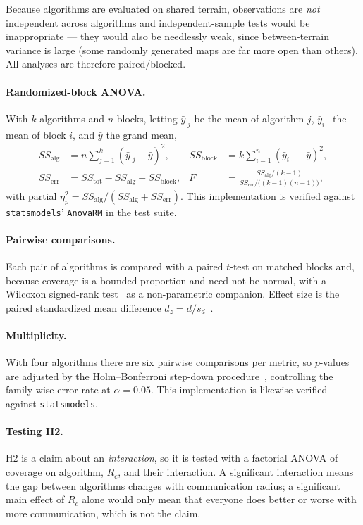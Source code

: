 \documentclass[11pt]{article}
\begin{document}
Because algorithms are evaluated on shared terrain, observations are
\emph{not} independent across algorithms and independent-sample tests would be
inappropriate --- they would also be needlessly weak, since between-terrain
variance is large (some randomly generated maps are far more open than others).
All analyses are therefore paired/blocked.

\paragraph{Randomized-block ANOVA.}
With $k$ algorithms and $n$ blocks, letting $\bar y_{\cdot j}$ be the mean of
algorithm $j$, $\bar y_{i \cdot}$ the mean of block $i$, and $\bar y$ the grand
mean,
\begin{align}
SS_{\text{alg}} &= n \sum_{j=1}^{k} (\bar y_{\cdot j} - \bar y)^2, &
SS_{\text{block}} &= k \sum_{i=1}^{n} (\bar y_{i \cdot} - \bar y)^2, \\
SS_{\text{err}} &= SS_{\text{tot}} - SS_{\text{alg}} - SS_{\text{block}}, &
F &= \frac{SS_{\text{alg}} / (k-1)}{SS_{\text{err}} / \big((k-1)(n-1)\big)},
\end{align}
with partial $\eta^2_p = SS_{\text{alg}} / (SS_{\text{alg}} + SS_{\text{err}})$.
This implementation is verified against \texttt{statsmodels}' \texttt{AnovaRM}
in the test suite.

\paragraph{Pairwise comparisons.}
Each pair of algorithms is compared with a paired $t$-test on matched blocks
and, because coverage is a bounded proportion and need not be normal, with a
Wilcoxon signed-rank test~\cite{wilcoxon1945} as a non-parametric companion.
Effect size is the paired standardized mean difference
$d_z = \bar d / s_d$~\cite{cohen1988}.

\paragraph{Multiplicity.}
With four algorithms there are six pairwise comparisons per metric, so
$p$-values are adjusted by the Holm--Bonferroni step-down
procedure~\cite{holm1979}, controlling the family-wise error rate at
$\alpha = 0.05$. This implementation is likewise verified against
\texttt{statsmodels}.

\paragraph{Testing H2.}
H2 is a claim about an \emph{interaction}, so it is tested with a factorial
ANOVA of coverage on algorithm, $R_c$, and their interaction. A significant
interaction means the gap between algorithms changes with communication radius;
a significant main effect of $R_c$ alone would only mean that everyone does
better or worse with more communication, which is not the claim.
\end{document}
